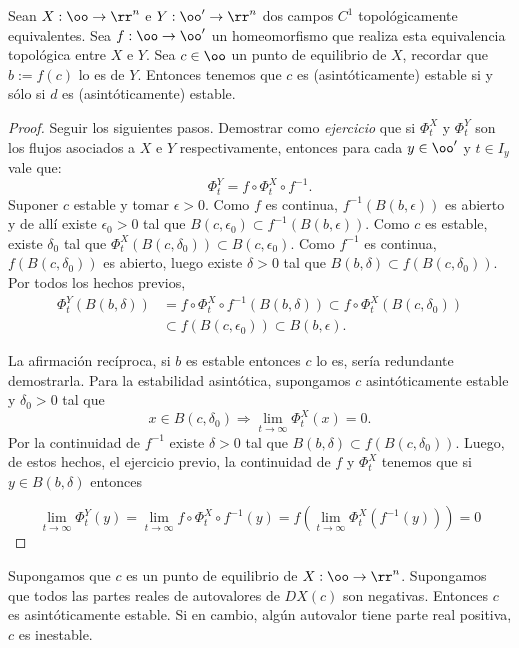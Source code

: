  

 


 \begin{teorema} Sean $X:\oo\to\rr^n$ e 
  $Y:\oo'\to\rr^n$ dos campos $C^1$ topológicamente equivalentes. Sea $f:\oo\to\oo'$ un homeomorfismo 
  que realiza esta equivalencia topológica entre $X$ e $Y$. Sea $c\in\oo$ un punto de equilibrio de $X$, recordar que
  $b:=f(c)$ lo es de $Y$. Entonces tenemos que  $c$ es (asintóticamente) estable  si y sólo si $d$ es 
  (asintóticamente) estable.
\end{teorema}
\begin{proof}
 Seguir los siguientes pasos. Demostrar  como  \emph{ejercicio} que si $\Phi_t^X$ y $\Phi_t^Y$ son los flujos asociados
 a $X$ e $Y$ respectivamente, entonces para cada $y\in\oo'$ y $t\in I_y$ vale que:
 \[\Phi_t^Y=f\circ\Phi_t^X\circ f^{-1}.\]
 Suponer $c$ estable y tomar $\epsilon>0$. Como $f$ es continua, $f^{-1}(B(b,\epsilon))$ es abierto
 y de allí existe $\epsilon_0>0$ tal que $B(c,\epsilon_0)\subset f^{-1}( B(b,\epsilon))$. Como  $c$ es estable, existe 
 $\delta_0$ tal que $\Phi_t^X(B(c,\delta_0))\subset B(c,\epsilon_0)$. Como $f^{-1}$ es continua, 
 $f(B(c,\delta_0))$ es abierto, luego existe $\delta>0$ tal que $B(b,\delta)\subset f(B(c,\delta_0))$. 
 Por todos los hechos previos,
 \[
  \begin{split} 
    \Phi_t^Y(B(b,\delta) )&=f\circ\Phi_t^X\circ f^{-1}(B(b,\delta) )\subset  f\circ\Phi_t^X(B(c,\delta_0))\\
	&\subset f(B(c,\epsilon_0)) \subset B(b,\epsilon).
   \end{split} 
 \]

 La afirmación recíproca, si $b$ es estable entonces $c$ lo es, sería redundante demostrarla. 
Para la estabilidad asintótica, supongamos $c$ asintóticamente estable y $\delta_0>0$  tal que 
\[x\in B(c,\delta_0)\Rightarrow \lim_{t\to\infty}\Phi_t^X(x)=0.\]
Por la continuidad de $f^{-1}$ existe $\delta>0$ tal que $B(b,\delta)\subset f(B(c,\delta_0))$. Luego, 
de estos hechos, el ejercicio previo, la continuidad de $f$ y $\Phi_t^X$ tenemos
que si $y\in B(b,\delta)$ entonces
 
 \[\lim_{t\to\infty}\Phi_t^Y(y)=\lim_{t\to\infty}f\circ\Phi_t^X\circ f^{-1}(y)=
 f\left( \lim_{t\to\infty}\Phi_t^X (f^{-1}(y))\right)=0\]
 
\end{proof}

\begin{corolario}
Supongamos que $c$ es un punto de equilibrio de $X:\oo\to\rr^n$. Supongamos que todos las partes reales de
 autovalores de 
 $DX(c)$ son negativas. Entonces $c$ es asintóticamente estable. Si en cambio, algún autovalor tiene parte real
 positiva, $c$ es inestable.
\end{corolario}


